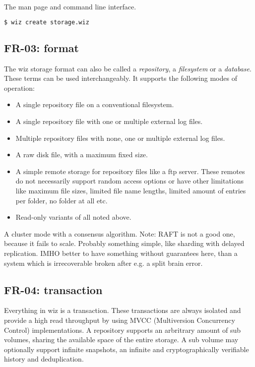 \documentclass[9pt,pagesize,DIV12,normalheadings,BCOR5mm,headexclude,footexclude]{scrbook}
\begin{document}
The man page and command line interface.

\begin{lstlisting}[language=bash]
    $ wiz create storage.wiz
\end{lstlisting}

\subsection{FR-03: format}
The wiz storage format can also be called a \textit{repository}, a
\textit{filesystem} or a \textit{database}. These terms can be used
interchangeably. It supports the following modes of operation:

\begin{itemize}
    \item A single repository file on a conventional filesystem.
    \item A single repository file with one or multiple external log files.
    \item Multiple repository files with none, one or multiple external log 
    files.
    \item A raw disk file, with a maximum fixed size.
    \item A simple remote storage for repository files like a ftp server.
    These remotes do not necessarily support random access options or have
    other limitations like maximum file sizes, limited file name lengths,
    limited amount of entries per folder, no folder at all etc. 
    \item Read-only variants of all noted above.
\end{itemize}

A cluster mode with a consensus algorithm. Note: RAFT is not a good one, 
because it fails to scale. Probably something simple, like sharding with
delayed replication. IMHO better to have something without guarantees here,
than a system which is irrecoverable broken after e.g. a split brain error.

\subsection{FR-04: transaction}
Everything in wiz is a transaction. These transactions are always
isolated and provide a high read throughput by using MVCC 
(Multiversion Concurrency Control) implementations.
A repository supports an arbritrary amount of sub volumes, sharing the 
available space of the entire storage. A sub volume may optionally 
support infinite snapshots, an infinite and 
cryptographically verifiable history and deduplication.
\end{document}
